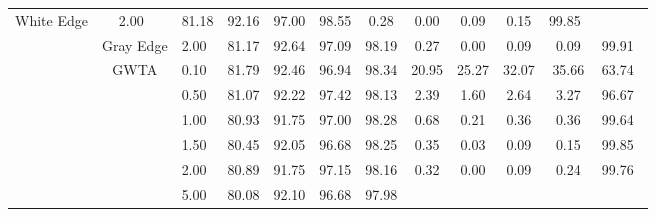 \begin{table}[htbp]
{\begin{tabular}{cc|c|ccccccccc}
  White Edge &
  2.00\ &
  \multicolumn{1}{c|}{81.18} &
  \multicolumn{1}{c|}{92.16} &
  \multicolumn{1}{c|}{97.00} &
  \multicolumn{1}{c|}{98.55} &
  \multicolumn{1}{c|}{0.28} &
  \multicolumn{1}{c|}{0.00} &
  \multicolumn{1}{c|}{0.09} &
  \multicolumn{1}{c|}{0.15} &
  99.85\ \\ \cline{2-12} 
\multicolumn{1}{c|}{} &
  Gray Edge &
  2.00\ &
  \multicolumn{1}{c|}{81.17} &
  \multicolumn{1}{c|}{92.64} &
  \multicolumn{1}{c|}{97.09} &
  \multicolumn{1}{c|}{98.19} &
  \multicolumn{1}{c|}{0.27} &
  \multicolumn{1}{c|}{0.00} &
  \multicolumn{1}{c|}{0.09} &
  \multicolumn{1}{c|}{0.09} &
  99.91\ \\ \cline{2-12} 
\multicolumn{1}{c|}{} &
  \multirow{9}{*}{GWTA}&
  0.10\ &
  \multicolumn{1}{c|}{81.79} &
  \multicolumn{1}{c|}{92.46} &
  \multicolumn{1}{c|}{96.94} &
  \multicolumn{1}{c|}{98.34} &
  \multicolumn{1}{c|}{20.95} &
  \multicolumn{1}{c|}{25.27} &
  \multicolumn{1}{c|}{32.07} &
  \multicolumn{1}{c|}{35.66} &
  63.74\ \\ \cline{3-12} 
\multicolumn{1}{c|}{} &
   &
  0.50\ &
  \multicolumn{1}{c|}{81.07} &
  \multicolumn{1}{c|}{92.22} &
  \multicolumn{1}{c|}{97.42} &
  \multicolumn{1}{c|}{98.13} &
  \multicolumn{1}{c|}{2.39} &
  \multicolumn{1}{c|}{1.60} &
  \multicolumn{1}{c|}{2.64} &
  \multicolumn{1}{c|}{3.27} &
  96.67\ \\ \cline{3-12} 
\multicolumn{1}{c|}{} &
   &
  1.00\ &
  \multicolumn{1}{c|}{80.93} &
  \multicolumn{1}{c|}{91.75} &
  \multicolumn{1}{c|}{97.00} &
  \multicolumn{1}{c|}{98.28} &
  \multicolumn{1}{c|}{0.68} &
  \multicolumn{1}{c|}{0.21} &
  \multicolumn{1}{c|}{0.36} &
  \multicolumn{1}{c|}{0.36} &
  99.64\ \\ \cline{3-12} 
\multicolumn{1}{c|}{} &
   &
  1.50\ &
  \multicolumn{1}{c|}{80.45} &
  \multicolumn{1}{c|}{92.05} &
  \multicolumn{1}{c|}{96.68} &
  \multicolumn{1}{c|}{98.25} &
  \multicolumn{1}{c|}{0.35} &
  \multicolumn{1}{c|}{0.03} &
  \multicolumn{1}{c|}{0.09} &
  \multicolumn{1}{c|}{0.15} &
  99.85\ \\ \cline{3-12} 
\multicolumn{1}{c|}{} &
   &
  2.00\ &
  \multicolumn{1}{c|}{80.89} &
  \multicolumn{1}{c|}{91.75} &
  \multicolumn{1}{c|}{97.15} &
  \multicolumn{1}{c|}{98.16} &
  \multicolumn{1}{c|}{0.32} &
  \multicolumn{1}{c|}{0.00} &
  \multicolumn{1}{c|}{0.09} &
  \multicolumn{1}{c|}{0.24} &
  99.76\ \\ \cline{3-12} 
\multicolumn{1}{c|}{} &
   &
  5.00\ &
  \multicolumn{1}{c|}{80.08} &
  \multicolumn{1}{c|}{92.10} &
  \multicolumn{1}{c|}{96.68} &
  \multicolumn{1}{c|}{97.98} &

\end{tabular}}
\end{table}

